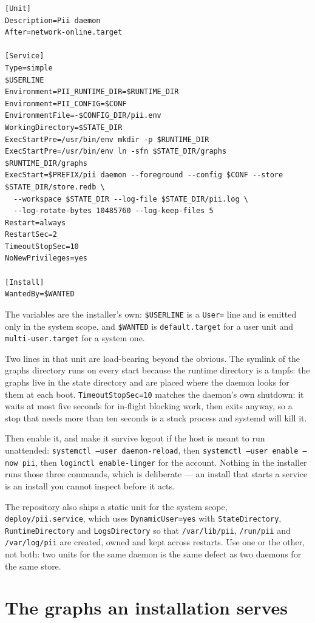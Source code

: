\begin{lstlisting}
[Unit]
Description=Pii daemon
After=network-online.target

[Service]
Type=simple
$USERLINE
Environment=PII_RUNTIME_DIR=$RUNTIME_DIR
Environment=PII_CONFIG=$CONF
EnvironmentFile=-$CONFIG_DIR/pii.env
WorkingDirectory=$STATE_DIR
ExecStartPre=/usr/bin/env mkdir -p $RUNTIME_DIR
ExecStartPre=/usr/bin/env ln -sfn $STATE_DIR/graphs $RUNTIME_DIR/graphs
ExecStart=$PREFIX/pii daemon --foreground --config $CONF --store $STATE_DIR/store.redb \
  --workspace $STATE_DIR --log-file $STATE_DIR/pii.log \
  --log-rotate-bytes 10485760 --log-keep-files 5
Restart=always
RestartSec=2
TimeoutStopSec=10
NoNewPrivileges=yes

[Install]
WantedBy=$WANTED
\end{lstlisting}

The variables are the installer's own: \texttt{\$USERLINE} is a \texttt{User=} line and is
emitted only in the system scope, and \texttt{\$WANTED} is \texttt{default.target} for a
user unit and \texttt{multi-user.target} for a system one.

Two lines in that unit are load-bearing beyond the obvious. The symlink of the graphs
directory runs on every start because the runtime directory is a tmpfs: the graphs live in
the state directory and are placed where the daemon looks for them at each boot.
\texttt{TimeoutStopSec=10} matches the daemon's own shutdown: it waits at most five seconds
for in-flight blocking work, then exits anyway, so a stop that needs more than ten seconds
is a stuck process and systemd will kill it.

Then enable it, and make it survive logout if the host is meant to run unattended:
\texttt{systemctl --user daemon-reload}, then \texttt{systemctl --user enable --now pii},
then \texttt{loginctl enable-linger} for the account. Nothing in the installer runs those
three commands, which is deliberate --- an install that starts a service is an install you
cannot inspect before it acts.

The repository also ships a static unit for the system scope,
\texttt{deploy/pii.service}, which uses \texttt{DynamicUser=yes} with
\texttt{StateDirectory}, \texttt{RuntimeDirectory} and \texttt{LogsDirectory} so that
\texttt{/var/lib/pii}, \texttt{/run/pii} and \texttt{/var/log/pii} are created, owned and
kept across restarts. Use one or the other, not both: two units for the same daemon is the
same defect as two daemons for the same store.

\section{The graphs an installation serves}

